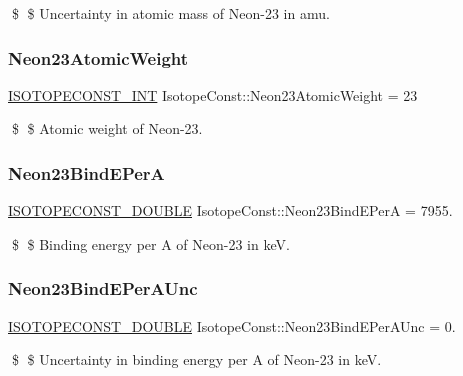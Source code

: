 \$ \$ Uncertainty in atomic mass of Neon-\/23 in amu. \mbox{\label{group___isotope_const-_neon-_ne23_ga30799a0fb17b03b58c32dd3d79da5d92}} 
\subsubsection{\texorpdfstring{Neon23\+Atomic\+Weight}{Neon23AtomicWeight}}
{\footnotesize\ttfamily \mbox{\hyperlink{group___isotope_const-_macros_ga5f18360b3e99483a35c32d789e62621c}{I\+S\+O\+T\+O\+P\+E\+C\+O\+N\+S\+T\+\_\+\+I\+NT}} Isotope\+Const\+::\+Neon23\+Atomic\+Weight = 23}

\$ \$ Atomic weight of Neon-\/23. \mbox{\label{group___isotope_const-_neon-_ne23_gad5d1d032d45e44d1914bddc97a1ed6c6}} 
\subsubsection{\texorpdfstring{Neon23\+Bind\+E\+PerA}{Neon23BindEPerA}}
{\footnotesize\ttfamily \mbox{\hyperlink{group___isotope_const-_macros_ga8f45a7272ce02c0b4c65c44636ed719a}{I\+S\+O\+T\+O\+P\+E\+C\+O\+N\+S\+T\+\_\+\+D\+O\+U\+B\+LE}} Isotope\+Const\+::\+Neon23\+Bind\+E\+PerA = 7955.}

\$ \$ Binding energy per A of Neon-\/23 in keV. \mbox{\label{group___isotope_const-_neon-_ne23_ga2f49f3443c538377e347f46403ce2169}} 
\subsubsection{\texorpdfstring{Neon23\+Bind\+E\+Per\+A\+Unc}{Neon23BindEPerAUnc}}
{\footnotesize\ttfamily \mbox{\hyperlink{group___isotope_const-_macros_ga8f45a7272ce02c0b4c65c44636ed719a}{I\+S\+O\+T\+O\+P\+E\+C\+O\+N\+S\+T\+\_\+\+D\+O\+U\+B\+LE}} Isotope\+Const\+::\+Neon23\+Bind\+E\+Per\+A\+Unc = 0.}

\$ \$ Uncertainty in binding energy per A of Neon-\/23 in keV. \mbox{\label{group___isotope_const-_neon-_ne23_ga7439cd6e5dcec9e70ff50f2ac8e2a491}} 
